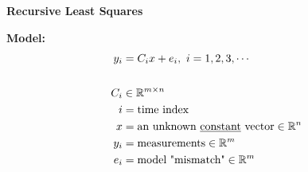 \documentclass[letterpaper]{article}
\newcommand{\real}{\mathbb R}  %
\begin{document}
\begin{center}
    \textbf{Recursive Least Squares}
\end{center}
\textbf{Model:}
    \begin{align*}
        y_i&=C_ix+e_i,\ i=1, 2, 3, \dotsb\\
        \\
        C_i& \in \real^{m \times n}\\
        i&=\textnormal{time index}\\
        x&=\textnormal{an unknown \underline{constant} vector} \in \real^n\\
        y_i&=\textnormal{measurements} \in \real^m\\
        e_i&=\textnormal{model "mismatch"} \in \real^m
    \end{align*}
\end{document}
